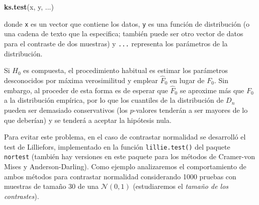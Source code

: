 \documentclass[
]{book}
\newenvironment{Shaded}{\begin{snugshade}}{\end{snugshade}}
\newcommand{\CommentTok}[1]{\textcolor[rgb]{0.56,0.35,0.01}{\textit{#1}}}
\newcommand{\ControlFlowTok}[1]{\textcolor[rgb]{0.13,0.29,0.53}{\textbf{#1}}}
\newcommand{\DecValTok}[1]{\textcolor[rgb]{0.00,0.00,0.81}{#1}}
\newcommand{\KeywordTok}[1]{\textcolor[rgb]{0.13,0.29,0.53}{\textbf{#1}}}
\newcommand{\NormalTok}[1]{#1}
\newcommand{\OperatorTok}[1]{\textcolor[rgb]{0.81,0.36,0.00}{\textbf{#1}}}
\newcommand{\StringTok}[1]{\textcolor[rgb]{0.31,0.60,0.02}{#1}}
\theoremstyle{break}
\theoremstyle{definition}
\theoremstyle{definition}
\theoremstyle{definition}
\theoremstyle{remark}
\begin{document}
\begin{Shaded}
\begin{Highlighting}[]
\KeywordTok{ks.test}\NormalTok{(x, y, ...)}
\end{Highlighting}
\end{Shaded}

donde \texttt{x} es un vector que contiene los datos, \texttt{y} es una función de distribución
(o una cadena de texto que la especifica; también puede ser otro vector de datos
para el contraste de dos muestras) y \texttt{...} representa los parámetros de la distribución.

Si \(H_0\) es compuesta, el procedimiento habitual es estimar los parámetros desconocidos
por máxima verosimilitud y emplear \(\hat{F}_0\) en lugar de \(F_0\).
Sin embargo, al proceder de esta forma es de esperar que \(\hat{F}_0\) se aproxime más
que \(F_0\) a la distribución empírica, por lo que los cuantiles de la distribución de
\(D_n\) pueden ser demasiado conservativos (los \(p\)-valores tenderán a ser mayores de
lo que deberían) y se tenderá a aceptar la hipótesis nula.

Para evitar este problema, en el caso de contrastar normalidad se desarrolló el test
de Lilliefors, implementado en la función \texttt{lillie.test()} del paquete \texttt{nortest}
(también hay versiones en este paquete para los métodos de Cramer-von Mises y
Anderson-Darling). Como ejemplo analizaremos el comportamiento de ambos métodos
para contrastar normalidad considerando 1000 pruebas con muestras de tamaño 30 de
una \(\mathcal{N}(0,1)\) (estudiaremos el \emph{tamaño de los contrastes}).

\begin{Shaded}
\end{Shaded}
\end{document}
